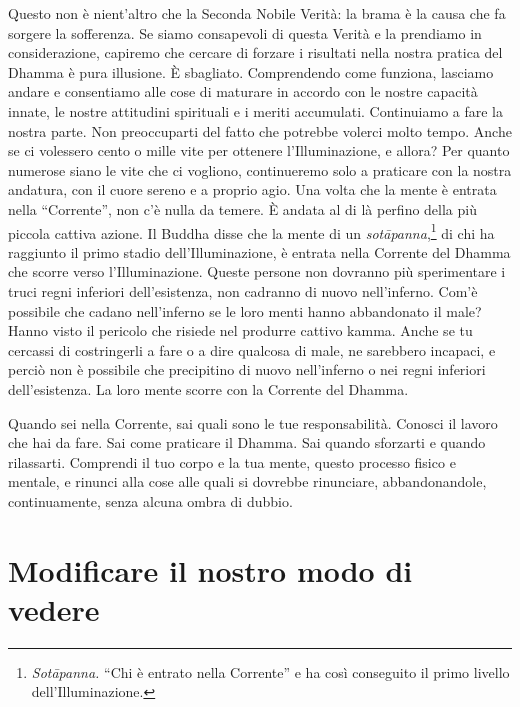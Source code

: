 Questo non è nient'altro che la Seconda Nobile Verità: la brama è la
causa che fa sorgere la sofferenza. Se siamo consapevoli di questa
Verità e la prendiamo in considerazione, capiremo che cercare di forzare
i risultati nella nostra pratica del Dhamma è pura illusione. È
sbagliato. Comprendendo come funziona, lasciamo andare e consentiamo
alle cose di maturare in accordo con le nostre capacità innate, le
nostre attitudini spirituali e i meriti accumulati. Continuiamo a fare
la nostra parte. Non preoccuparti del fatto che potrebbe volerci molto
tempo. Anche se ci volessero cento o mille vite per ottenere
l'Illuminazione, e allora? Per quanto numerose siano le vite che ci
vogliono, continueremo solo a praticare con la nostra andatura, con il
cuore sereno e a proprio agio. Una volta che la mente è entrata nella
``Corrente'', non c'è nulla da temere. È andata al di là perfino della
più piccola cattiva azione. Il Buddha disse che la mente di un
\emph{sotāpanna},\footnote{\emph{Sotāpanna.} ``Chi è entrato nella
  Corrente'' e ha così conseguito il primo livello dell'Illuminazione.}
di chi ha raggiunto il primo stadio dell'Illuminazione, è entrata nella
Corrente del Dhamma che scorre verso l'Illuminazione. Queste persone non
dovranno più sperimentare i truci regni inferiori dell'esistenza, non
cadranno di nuovo nell'inferno. Com'è possibile che cadano nell'inferno
se le loro menti hanno abbandonato il male? Hanno visto il pericolo che
risiede nel produrre cattivo kamma. Anche se tu cercassi di
costringerli a fare o a dire qualcosa di male, ne sarebbero incapaci, e
perciò non è possibile che precipitino di nuovo nell'inferno o nei
regni inferiori dell'esistenza. La loro mente scorre con la Corrente del
Dhamma.

Quando sei nella Corrente, sai quali sono le tue responsabilità. Conosci
il lavoro che hai da fare. Sai come praticare il Dhamma. Sai quando
sforzarti e quando rilassarti. Comprendi il tuo corpo e la tua mente,
questo processo fisico e mentale, e rinunci alla cose alle quali si
dovrebbe rinunciare, abbandonandole, continuamente, senza alcuna ombra
di dubbio.

\section{Modificare il nostro modo di vedere}

